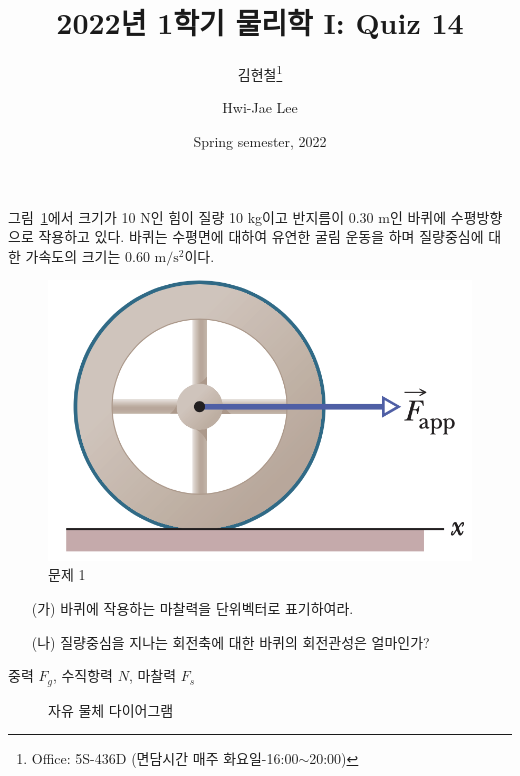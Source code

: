 \documentclass[floatfix,nofootinbib,superscriptaddress,fleqn]{revtex4-2}
\begin{document}
\title{\Large 2022년 1학기 물리학 I: Quiz 14}
\author{김현철\footnote{Office: 5S-436D (면담시간 매주
    화요일-16:00$\sim$20:00)}} 
\author{Hwi-Jae Lee} 
\date{Spring semester, 2022}

\vspace{1.cm}

\maketitle

그림~\ref{fig:1}에서 크기가 10 N인 힘이 질량 10 kg이고 반지름이 0.30
m인 바퀴에 수평방향으로 작용하고 있다. 바퀴는 수평면에 대하여 유연한
굴림 운동을 하며 질량중심에 대한 가속도의 크기는 0.60
$\mathrm{m/s^2}$이다. 
\begin{figure}[htp]
  \centering
\includegraphics[scale=0.5]{Qfig14-1-20220427.png}
  \caption{문제 1}
  \label{fig:1}
\end{figure}
\begin{itemize}
\item[(가)] 바퀴에 작용하는 마찰력을 단위벡터로 표기하여라.
\item[(나)] 질량중심을 지나는 회전축에 대한 바퀴의 회전관성은
  얼마인가?   
\end{itemize}

중력 $F_g$, 수직항력 $N$, 마찰력 $F_s$
\begin{figure}[htp]
  \centering
  \caption{자유 물체 다이어그램}
\end{figure}
\end{document}
